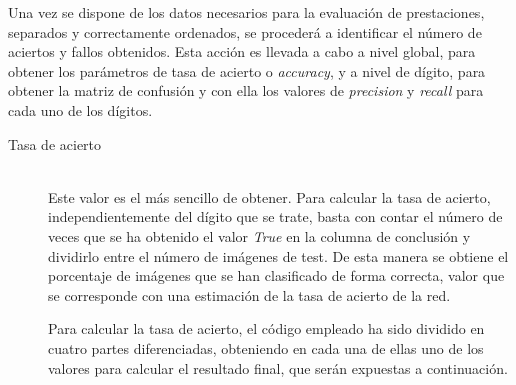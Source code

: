 Una vez se dispone de los datos necesarios para la evaluación de prestaciones, separados y correctamente ordenados, se procederá a identificar el número de aciertos y fallos obtenidos. Esta acción es llevada a cabo a nivel global, para obtener los parámetros de tasa de acierto o \textit{accuracy}, y a nivel de dígito, para obtener la matriz de confusión y con ella los valores de \textit{precision} y \textit{recall} para cada uno de los dígitos.
\vspace{5pt}

\begin{description}
	\item[Tasa de acierto] \hfill 
	\vspace{5pt}
	\\
	Este valor es el más sencillo de obtener. Para calcular la tasa de acierto, independientemente del dígito que se trate, basta con contar el número de veces que se ha obtenido el valor \textit{True} en la columna de conclusión y dividirlo entre el número de imágenes de test. De esta manera se obtiene el porcentaje de imágenes que se han clasificado de forma correcta, valor que se corresponde con una estimación de la tasa de acierto de la red.\\
	\vspace{10pt}
	
	Para calcular la tasa de acierto, el código empleado ha sido dividido en cuatro partes diferenciadas, obteniendo en cada una de ellas uno de los valores para calcular el resultado final, que serán expuestas a continuación.


\end{description}
